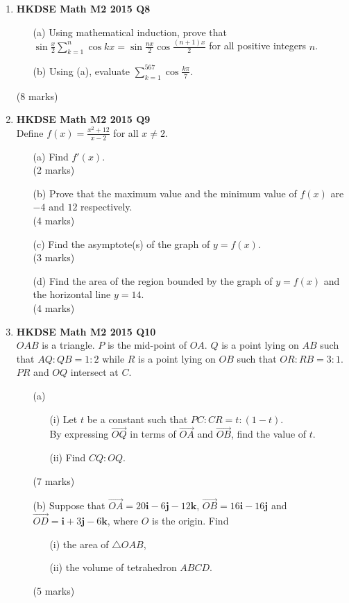 \documentclass[12pt]{article}
\begin{document}
\begin{enumerate}
	\item \textbf{HKDSE Math M2 2015 Q8}
	\begin{enumerate}
		\item [(a)]Using mathematical induction, prove that $\sin{\displaystyle\frac{x}{2}} \displaystyle\sum_{k = 1}^{n}\cos{kx} = \sin{\displaystyle\frac{nx}{2}}\cos{\displaystyle\frac{(n+1)x}{2}}$ for all positive integers $n$. 
		\item [(b)]Using (a), evaluate $\displaystyle\sum_{k = 1}^{567}\cos{\displaystyle\frac{k\pi}{7}}$.
	\end{enumerate}
	(8 marks)

	\item \textbf{HKDSE Math M2 2015 Q9}\\
	Define $f(x) = \displaystyle\frac{x^2+12}{x - 2}$ for all $x \neq 2$.  
	\begin{enumerate}
		\item [(a)]Find $f'(x)$. \\(2 marks)
		\item [(b)]Prove that the maximum value and the minimum value of $f(x)$ are $-4$ and $12$ respectively. \\(4 marks)
		\item [(c)]Find the asymptote(s) of the graph of $y = f(x)$. \\(3 marks) 
		\item [(d)]Find the area of the region bounded by the graph of $y = f(x)$ and the horizontal line $y = 14$.  \\(4 marks)
	\end{enumerate}


	\item \textbf{HKDSE Math M2 2015 Q10}\\
	$OAB$ is a triangle. $P$ is the mid-point of $OA$. $Q$ is a point lying on $AB$ such that $AQ : QB = 1 : 2$ while $R$ is a point lying on $OB$ such that $OR : RB = 3:1$. $PR$ and $OQ$ intersect at $C$. 
	\begin{enumerate}
		\item [(a)]		
		\begin{enumerate}
			\item [(i)]Let $t$ be a constant such that $PC : CR = t : (1-t)$.\\
				By expressing $\overrightarrow{OQ}$ in terms of $\overrightarrow{OA}$ and $\overrightarrow{OB}$, find the value of $t$. 
			\item [(ii)]Find $CQ:OQ$. 
		\end{enumerate}
		(7 marks)
		\item [(b)]Suppose that $\overrightarrow{OA} = 20\textbf{i} -6 \textbf{j} -12\textbf {k}$, $\overrightarrow{OB} = 16\textbf{i} -16 \textbf{j}$ and $\overrightarrow{OD} = \textbf{i} +3 \textbf{j} -6\textbf {k}$, where $O$ is the origin. Find
		\begin{enumerate}
			\item [(i)]the area of $\triangle OAB$, 
			\item [(ii)]the volume of tetrahedron $ABCD$.
		\end{enumerate}
		(5 marks)
	\end{enumerate}




\end{enumerate}
\end{document}
